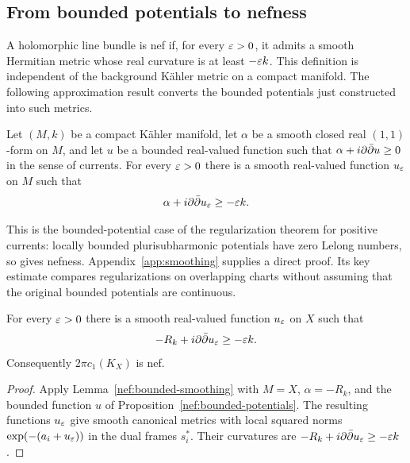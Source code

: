 \subsection{From bounded potentials to nefness}

A holomorphic line bundle is nef if, for every $\varepsilon>0$, it admits a
smooth Hermitian metric whose real curvature is at least $-\varepsilon k$.
This definition is independent of the background K\"ahler metric on
a compact manifold. The following approximation result converts the
bounded potentials just constructed into such metrics.

\begin{lemma}
\label{nef:bounded-smoothing}
Let $(M,k)$ be a compact K\"ahler manifold, let $\alpha$ be a smooth
closed real $(1,1)$-form on $M$, and let $u$ be a bounded real-valued
function such that $\alpha+i\partial\bar\partial u\geq0$ in the sense of currents.
For every $\varepsilon>0$ there is a smooth real-valued function $u_\varepsilon$
on $M$ such that
\[
 \alpha+i\partial\bar\partial u_\varepsilon\geq-\varepsilon k.
\]
\end{lemma}

This is the bounded-potential case of the regularization theorem for
positive currents: locally bounded plurisubharmonic potentials have
zero Lelong numbers, so \cite[Corollary~6.4]{Demailly1992} gives
nefness. Appendix~\ref{app:smoothing} supplies a direct proof. Its
key estimate compares regularizations on overlapping charts without
assuming that the original bounded potentials are continuous.

\begin{proposition}
\label{nef:nef}
For every $\varepsilon>0$ there is a smooth real-valued function $u_\varepsilon$
on $X$ such that
\[
 -R_k+i\partial\bar\partial u_\varepsilon\geq-\varepsilon k.
\]
Consequently $2\pi c_1(K_X)$ is nef.
\end{proposition}

\begin{proof}
Apply Lemma~\ref{nef:bounded-smoothing} with $M=X$, $\alpha=-R_k$,
and the bounded function $u$ of Proposition~\ref{nef:bounded-potentials}.
The resulting functions $u_\varepsilon$ give smooth canonical metrics with
local squared norms $\exp(-(a_i+u_\varepsilon))$ in the dual frames $s_i^*$.
Their curvatures are $-R_k+i\partial\bar\partial u_\varepsilon\geq-\varepsilon k$.
\end{proof}
